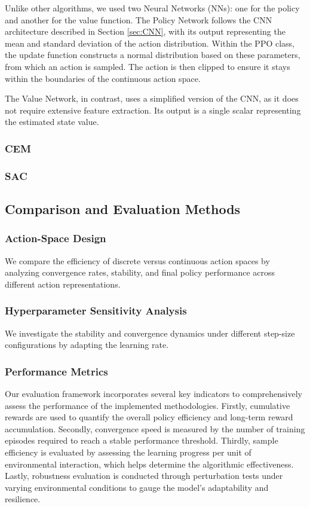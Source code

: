 \documentclass[../CSC_52081_EP.tex]{subfiles}
\begin{document}
Unlike other algorithms, we used two Neural Networks (NNs): one for the policy and another for the value function. The Policy Network follows the CNN architecture described in Section \ref{sec:CNN}, with its output representing the mean and standard deviation of the action distribution. Within the PPO class, the update function constructs a normal distribution based on these parameters, from which an action is sampled. The action is then clipped to ensure it stays within the boundaries of the continuous action space.

The Value Network, in contrast, uses a simplified version of the CNN, as it does not require extensive feature extraction. Its output is a single scalar representing the estimated state value.
\hspace{1cm}
\subsubsection{CEM}


\hspace{1cm}
\subsubsection{SAC}



\subsection{Comparison and Evaluation Methods}

\subsubsection{Action-Space Design}
We compare the efficiency of discrete versus continuous action spaces by analyzing convergence rates, stability, and final policy performance across different action representations.

\subsubsection{Hyperparameter Sensitivity Analysis}
We investigate the stability and convergence dynamics under different step-size configurations by adapting the learning rate.

\subsubsection{Performance Metrics}
Our evaluation framework incorporates several key indicators to comprehensively assess the performance of the implemented methodologies. Firstly, cumulative rewards are used to quantify the overall policy efficiency and long-term reward accumulation. Secondly, convergence speed is measured by the number of training episodes required to reach a stable performance threshold. Thirdly, sample efficiency is evaluated by assessing the learning progress per unit of environmental interaction, which helps determine the algorithmic effectiveness. Lastly, robustness evaluation is conducted through perturbation tests under varying environmental conditions to gauge the model's adaptability and resilience.
\end{document}
